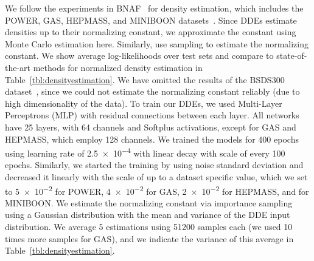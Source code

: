 \documentclass{article}
\begin{document}
We follow the experiments in BNAF~\citep{de2019block} for density estimation, which includes the POWER, GAS, HEPMASS, and MINIBOON datasets~\citep{asuncion2007uci}. Since DDEs estimate densities up to their normalizing constant, we approximate the constant using Monte Carlo estimation here.
Similarly, \citet{li2019learning} use sampling to estimate the normalizing constant.
We show average log-likelihoods over test sets and compare to state-of-the-art methods for normalized density estimation in Table~\ref{tbl:densityestimation}.
We have omitted the results of the BSDS300 dataset~\citep{martin2001database}, since we could not estimate the normalizing constant reliably (due to high dimensionality of the data).
To train our DDEs, we used Multi-Layer Perceptrons (MLP) with residual connections between each layer.
All networks have 25 layers, with 64 channels and Softplus activations, except for GAS and HEPMASS, which employ 128 channels.
We trained the models for 400 epochs using learning rate of \num{2.5e-4} with linear decay with scale of  every 100 epochs.
Similarly, we started the training by using noise standard deviation  and decreased it linearly with the scale of  up to a dataset specific value, which we set to \num{5e-2} for POWER, \num{4e-2} for GAS, \num{2e-2} for HEPMASS, and  for MINIBOON.
We estimate the normalizing constant via importance sampling using a Gaussian distribution with the mean and variance of the DDE input distribution.
We average 5 estimations using 51200 samples each (we used 10 times more samples for GAS), and we indicate the variance of this average in Table~\ref{tbl:densityestimation}. 

\newcommand{\addvar}[1]{{\tiny{}}}
\newcommand{\descrcell}[2]{\scriptsize
  \begin{tabular}[t]{@{}c@{}}\normalsize#1\\ \tiny{#2}\end{tabular}}
\end{document}
